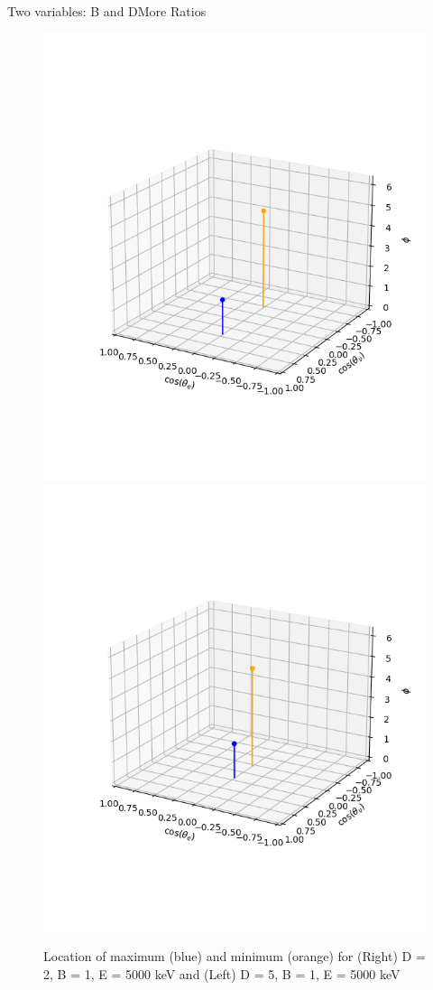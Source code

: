 \documentclass{beamer}
\begin{document}
\begin{frame}{Two variables: B and D}{More Ratios}
	\begin{figure}
		\centering
		\includegraphics[width=0.4\paperwidth]{plots/posD_posB_hiD_max_min}
		\includegraphics[width=0.4\paperwidth]{plots/posD_posB_vhiD_max_min}
		\caption{Location of maximum (blue) and minimum (orange) for (Right) D = 2, B = 1, E = 5000 keV and (Left) D = 5, B = 1, E = 5000 keV}
	\end{figure}
\end{frame}
\end{document}
